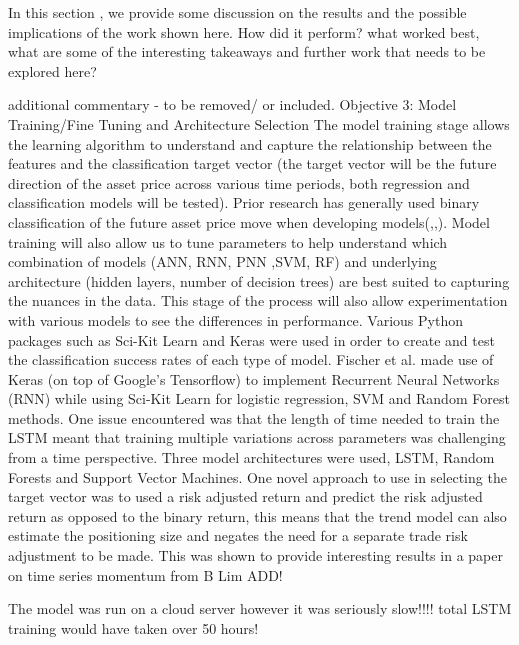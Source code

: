 \documentclass[11pt]{article}
\begin{document}
In this section , we provide some discussion on the results and the possible implications of the work shown here.
How did it perform? what worked best, what are some of the interesting takeaways and further work that needs to be explored here?
\clearpage


additional commentary - to be removed/ or included.
Objective 3: Model Training/Fine Tuning and Architecture Selection
The model training stage allows the learning algorithm to understand and capture the relationship between the features and the classification target vector (the target vector will be the future direction of the asset price across various time periods, both regression and classification models will be tested). Prior research has generally used binary classification of the future asset price move when developing models(\cite{Abreu2018},\cite{Gunduz2017},\cite{Chatzis2018}). \newline Model training will also allow us to tune parameters to help understand which combination of models (ANN, RNN, PNN ,SVM, RF) and underlying architecture (hidden layers, number of decision trees) are best suited to capturing the nuances in the data. This stage of the process will also allow experimentation with various  models to see the differences in performance. Various Python packages such as Sci-Kit Learn and Keras were used in order to create and test the classification success rates of each type of model. Fischer et al. made use of Keras (on top of Google's Tensorflow) to implement Recurrent Neural Networks (RNN) \cite{Fischer2018} while using Sci-Kit Learn for logistic regression, SVM and Random Forest methods. \newline One issue encountered was that the length of time needed to train the LSTM meant that training multiple variations across parameters was challenging from a time perspective. Three model architectures were used, LSTM, Random Forests and Support Vector Machines. One novel approach to use in selecting the target vector was to used a risk adjusted return and predict the risk adjusted return as opposed to the binary return, this means that the trend model can also estimate the positioning size and negates the need for a separate trade risk adjustment to be made.  This was shown to provide interesting results in a paper on time series momentum from B Lim ADD!

The model was run on a cloud server however it was seriously slow!!!! total LSTM training would have taken over 50 hours!
\end{document}
